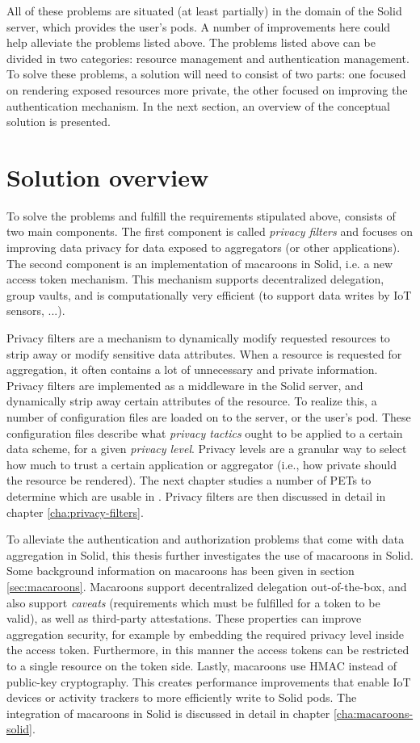 \noindent All of these problems are situated (at least partially) in the domain of the Solid server, which provides the user's pods. A number of improvements here could help alleviate the problems listed above. The problems listed above can be divided in two categories: resource management and authentication management. To solve these problems, a solution will need to consist of two parts: one focused on rendering exposed resources more private, the other focused on improving the authentication mechanism. In the next section, an overview of the conceptual solution is presented.

\section{Solution overview}
To solve the problems and fulfill the requirements stipulated above, \middleware{} consists of two main components. The first component is called \textit{privacy filters} and focuses on improving data privacy for data exposed to aggregators (or other applications). The second component is an implementation of macaroons in Solid, i.e. a new access token mechanism. This mechanism supports decentralized delegation, group vaults, and is computationally very efficient (to support data writes by IoT sensors, ...).

Privacy filters are a mechanism to dynamically modify requested resources to strip away or modify sensitive data attributes. When a resource is requested for aggregation, it often contains a lot of unnecessary and private information. Privacy filters are implemented as a middleware in the Solid server, and dynamically strip away certain attributes of the resource. To realize this, a number of configuration files are loaded on to the server, or the user's pod. These configuration files describe what \textit{privacy tactics} ought to be applied to a certain data scheme, for a given \textit{privacy level}. Privacy levels are a granular way to select how much to trust a certain application or aggregator (i.e., how private should the resource be rendered). The next chapter studies a number of \gls{PETs} to determine which are usable in \middleware{}. Privacy filters are then discussed in detail in chapter \ref{cha:privacy-filters}. 

To alleviate the authentication and authorization problems that come with data aggregation in Solid, this thesis further investigates the use of macaroons in Solid. Some background information on macaroons has been given in section \ref{sec:macaroons}. Macaroons support decentralized delegation out-of-the-box, and also support \textit{caveats} (requirements which must be fulfilled for a token to be valid), as well as third-party attestations. These properties can improve aggregation security, for example by embedding the required privacy level inside the access token. Furthermore, in this manner the access tokens can be restricted to a single resource on the token side. Lastly, macaroons use \acrfull{HMAC} instead of public-key cryptography. This creates performance improvements that enable IoT devices or activity trackers to more efficiently write to Solid pods. The integration of macaroons in Solid is discussed in detail in chapter \ref{cha:macaroons-solid}.

